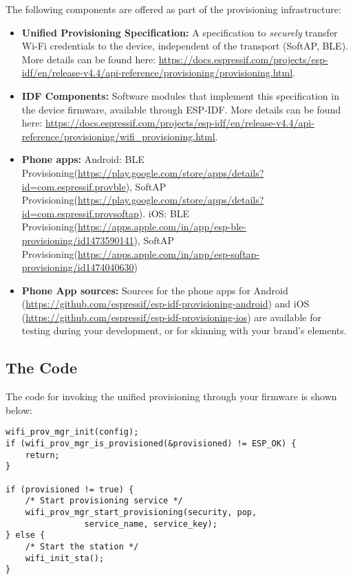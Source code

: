 \documentclass[main.tex]{subfiles}
\begin{document}
The following components are offered as part of the provisioning infrastructure:
\begin{itemize}
    \item \textbf{Unified Provisioning Specification:} A specification to \textit{securely} transfer Wi-Fi credentials to the device, independent of the transport (SoftAP, BLE). More details can be found here: \url{https://docs.espressif.com/projects/esp-idf/en/release-v4.4/api-reference/provisioning/provisioning.html}.
    \item \textbf{IDF Components:} Software modules that implement this specification in the device firmware, available through ESP-IDF. More details can be found here: \url{https://docs.espressif.com/projects/esp-idf/en/release-v4.4/api-reference/provisioning/wifi_provisioning.html}.
    \item \textbf{Phone apps:} Android: BLE Provisioning(\url{https://play.google.com/store/apps/details?id=com.espressif.provble}), SoftAP Provisioning(\url{https://play.google.com/store/apps/details?id=com.espressif.provsoftap}). iOS: BLE Provisioning(\url{https://apps.apple.com/in/app/esp-ble-provisioning/id1473590141}), SoftAP Provisioning(\url{https://apps.apple.com/in/app/esp-softap-provisioning/id1474040630})
    \item \textbf{Phone App sources:} Sources for the phone apps for Android (\url{https://github.com/espressif/esp-idf-provisioning-android}) and iOS (\url{https://github.com/espressif/esp-idf-provisioning-ios}) are available for testing during your development, or for skinning with your brand's elements.
\end{itemize}

\subsection{The Code}
The code for invoking the unified provisioning through your firmware is shown below:
\begin{verbatim}
wifi_prov_mgr_init(config);
if (wifi_prov_mgr_is_provisioned(&provisioned) != ESP_OK) {
    return;
}

if (provisioned != true) {
    /* Start provisioning service */
    wifi_prov_mgr_start_provisioning(security, pop,
                service_name, service_key);
} else {
    /* Start the station */
    wifi_init_sta();
}
\end{verbatim}
\end{document}
